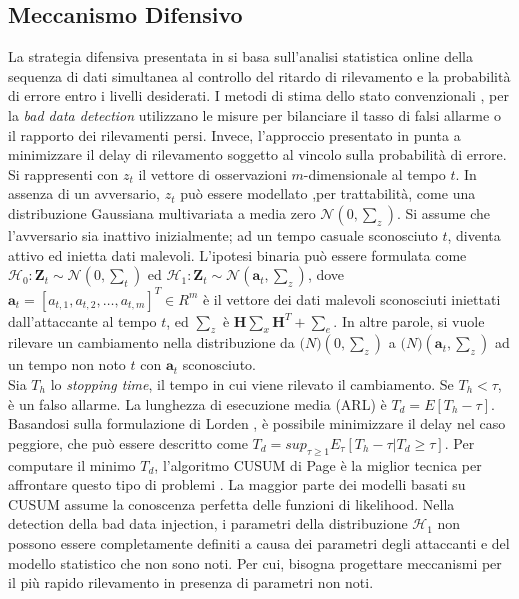 \subsection{Meccanismo Difensivo}
La strategia difensiva presentata in \cite{baddatainjattackdef} si basa sull'analisi statistica online della sequenza di dati simultanea al controllo del ritardo di rilevamento e la probabilità di errore entro i livelli desiderati. I metodi di stima dello stato convenzionali \cite{convdef1}, \cite{convdef2} per la \emph{bad data detection} utilizzano le misure per bilanciare il tasso di falsi allarme o il rapporto dei rilevamenti persi. Invece, l'approccio presentato in \cite{baddatainjattackdef} punta a minimizzare il delay di rilevamento soggetto al vincolo sulla probabilità di errore.\\
Si rappresenti con $z_t$ il vettore di osservazioni $m$-dimensionale al tempo $t$. In assenza di un avversario, $z_t$ può essere modellato ,per trattabilità, come una distribuzione Gaussiana multivariata a media zero $\mathcal{N}(0, \sum_z)$. Si assume che l'avversario sia inattivo inizialmente; ad un tempo casuale sconosciuto $t$, diventa attivo ed inietta dati malevoli. L'ipotesi binaria può essere formulata come $\mathcal{H}_0: \textbf{Z}_t \sim \mathcal{N}(0, \sum_t)$ ed $\mathcal{H}_1: \textbf{Z}_t \sim \mathcal{N}(\textbf{a}_t, \sum_z)$, dove $\textbf{a}_t = [a_{t,1}, a_{t,2}, \ldots, a_{t,m}]^T \in R^m$ è il vettore dei dati malevoli sconosciuti iniettati dall'attaccante al tempo $t$, ed $\sum_z$ è $\textbf{H}\sum_x\textbf{H}^T + \sum_e$. In altre parole, si vuole rilevare un cambiamento nella distribuzione da $\mathcal(N)(0, \sum_z)$ a $\mathcal(N)(\textbf{a}_t, \sum_z)$ ad un tempo non noto $t$ con $\textbf{a}_t$ sconosciuto.\\
Sia $T_h$ lo \emph{stopping time}, il tempo in cui viene rilevato il cambiamento. Se $T_h < \tau$, è un falso allarme. La lunghezza di esecuzione media (ARL) è $T_d = E[T_h - \tau]$. Basandosi sulla formulazione di Lorden \cite{lorden}, è possibile minimizzare il delay nel caso peggiore, che può essere descritto come $T_d = sup_{\tau \geq 1} E_{\tau}[T_h - \tau | T_d \geq \tau]$. Per computare il minimo $T_d$, l'algoritmo CUSUM di Page è la miglior tecnica per affrontare questo tipo di problemi \cite{lorden}. La maggior parte dei modelli basati su CUSUM assume la conoscenza perfetta delle funzioni di likelihood. Nella detection della bad data injection, i parametri della distribuzione $\mathcal{H}_1$ non possono essere completamente definiti a causa dei parametri degli attaccanti e del modello statistico che non sono noti. Per cui, bisogna progettare meccanismi per il più rapido rilevamento in presenza di parametri non noti.\\
